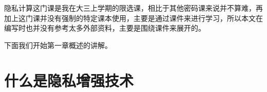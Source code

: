 \documentclass[12pt, a4paper, oneside]{ctexart}
\begin{document}
隐私计算这门课是我在大三上学期的限选课，相比于其他密码课来说并不算难，再加上这门课并没有强制的特定课本使用，主要是通过课件来进行学习，所以本文在编写时也并没有参考太多外部资料，主要是围绕课件来展开的。

下面我们开始第一章概述的讲解。

\section*{什么是隐私增强技术}
\end{document}
